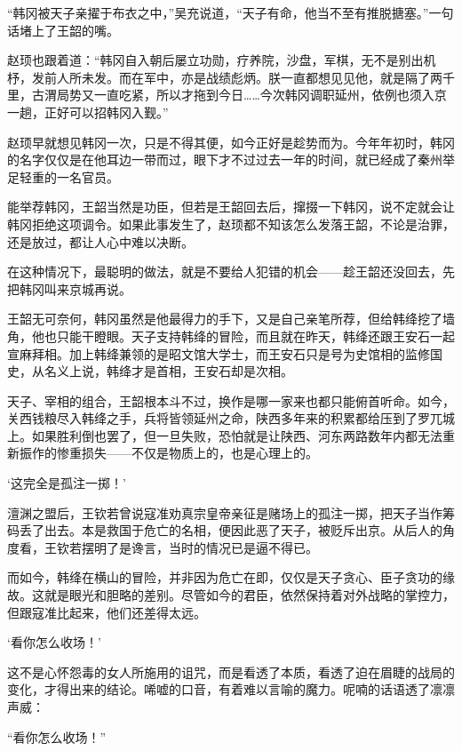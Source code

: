 “韩冈被天子亲擢于布衣之中，”吴充说道，“天子有命，他当不至有推脱搪塞。”一句话堵上了王韶的嘴。

赵顼也跟着道：“韩冈自入朝后屡立功勋，疗养院，沙盘，军棋，无不是别出机杼，发前人所未发。而在军中，亦是战绩彪炳。朕一直都想见见他，就是隔了两千里，古渭局势又一直吃紧，所以才拖到今日……今次韩冈调职延州，依例也须入京一趟，正好可以招韩冈入觐。”

赵顼早就想见韩冈一次，只是不得其便，如今正好是趁势而为。今年年初时，韩冈的名字仅仅是在他耳边一带而过，眼下才不过过去一年的时间，就已经成了秦州举足轻重的一名官员。

能举荐韩冈，王韶当然是功臣，但若是王韶回去后，撺掇一下韩冈，说不定就会让韩冈拒绝这项调令。如果此事发生了，赵顼都不知该怎么发落王韶，不论是治罪，还是放过，都让人心中难以决断。

在这种情况下，最聪明的做法，就是不要给人犯错的机会——趁王韶还没回去，先把韩冈叫来京城再说。

王韶无可奈何，韩冈虽然是他最得力的手下，又是自己亲笔所荐，但给韩绛挖了墙角，他也只能干瞪眼。天子支持韩绛的冒险，而且就在昨天，韩绛还跟王安石一起宣麻拜相。加上韩绛兼领的是昭文馆大学士，而王安石只是号为史馆相的监修国史，从名义上说，韩绛才是首相，王安石却是次相。

天子、宰相的组合，王韶根本斗不过，换作是哪一家来也都只能俯首听命。如今，关西钱粮尽入韩绛之手，兵将皆领延州之命，陕西多年来的积累都给压到了罗兀城上。如果胜利倒也罢了，但一旦失败，恐怕就是让陕西、河东两路数年内都无法重新振作的惨重损失——不仅是物质上的，也是心理上的。

‘这完全是孤注一掷！’

澶渊之盟后，王钦若曾说寇准劝真宗皇帝亲征是赌场上的孤注一掷，把天子当作筹码丢了出去。本是救国于危亡的名相，便因此恶了天子，被贬斥出京。从后人的角度看，王钦若摆明了是谗言，当时的情况已是逼不得已。

而如今，韩绛在横山的冒险，并非因为危亡在即，仅仅是天子贪心、臣子贪功的缘故。这就是眼光和胆略的差别。尽管如今的君臣，依然保持着对外战略的掌控力，但跟寇准比起来，他们还差得太远。

‘看你怎么收场！’

这不是心怀怨毒的女人所施用的诅咒，而是看透了本质，看透了迫在眉睫的战局的变化，才得出来的结论。唏嘘的口音，有着难以言喻的魔力。呢喃的话语透了凛凛声威：

“看你怎么收场！”

